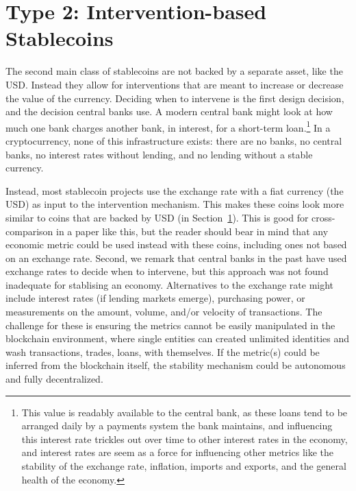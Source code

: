 \section{Type 2: Intervention-based Stablecoins}
\label{sec:t2}

The second main class of stablecoins are not backed by a separate asset, like the USD. Instead they allow for interventions that are meant to increase or decrease the value of the currency.  Deciding when to intervene is the first design decision, and the decision central banks use. A modern central bank might look at how much one bank charges another bank, in interest, for a short-term loan.\footnote{This value is readably available to the central bank, as these loans tend to be arranged daily by a payments system the bank maintains, and influencing this interest rate trickles out over time to other interest rates in the economy, and interest rates are seem as a force for influencing other metrics like the stability of the exchange rate, inflation, imports and exports, and the general health of the economy.} In a cryptocurrency, none of this infrastructure exists: there are no banks, no central banks, no interest rates without lending, and no lending without a stable currency.

Instead, most stablecoin projects use the exchange rate with a fiat currency (\eg the USD) as input to the intervention mechanism. This makes these coins look more similar to coins that are backed by USD (in Section~\ref{sec:t2}). This is good for cross-comparison in a paper like this, but the reader should bear in mind that any economic metric could be used instead with these coins, including ones not based on an exchange rate. Second, we remark that central banks in the past have used exchange rates to decide when to intervene, but this approach was not found inadequate for stablising an economy. Alternatives to the exchange rate might include interest rates (if lending markets emerge), purchasing power, or measurements on the amount, volume, and/or velocity of transactions. The challenge for these is ensuring the metrics cannot be easily manipulated in the blockchain environment, where single entities can created unlimited identities and wash transactions, trades, loans, \etc with themselves. If the metric(s) could be inferred from the blockchain itself, the stability mechanism could be autonomous and fully decentralized. 

